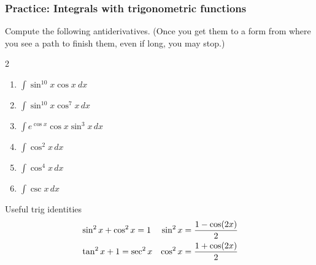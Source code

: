 \documentclass[14pt]{beamer}
\begin{document}
\begin{frame}[t]
	\fontsize{13}{13}\selectfont
	\frametitle{Practice: Integrals with trigonometric functions}

	Compute the following antiderivatives. (Once you get them to a form from where
	you see a path to finish them, even if long, you may stop.)

	\begin{multicols}{2}
		\begin{enumerate}
			\item $\displaystyle \int \sin^{10}x \cos x \ dx$
				\vspace{.2cm}

			\item $\displaystyle \int \sin^{10}x \cos^{7}x \, dx$
				\vspace{.2cm}

			\item $\displaystyle \int e^{\cos x}\cos x \sin^{3}x \, dx$
				\vspace{.2cm}

			\item $\displaystyle \int \cos^{2}x \, dx$
				\vspace{.2cm}

			\item $\displaystyle \int \cos^{4}x \, dx$
				\vspace{.2cm}

			\item $\displaystyle \int \csc x \, dx$
				\vspace{.2cm}
		\end{enumerate}
	\end{multicols}

	\vspace{-.5cm}
	{\fontsize{10}{10}\selectfont \begin{block}{ \fontsize{12}{12}\selectfont Useful trig identities}\vspace{-.5cm} \begin{align*}\large&\sin^{2}x + \cos^{2}x = 1&\sin^{2}x&= \frac{1 - \cos (2x)}{2}\\&\tan^{2}x + 1 = \sec^{2}x&\cos^{2}x&= \frac{1 + \cos (2x)}{2}\end{align*}\end{block} }
\end{frame}
\end{document}
